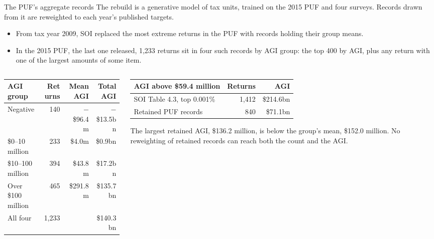 \begin{frame}{The PUF's aggregate records}
  \small
  The rebuild is a generative model of tax units, trained on the 2015 PUF and four surveys. Records
  drawn from it are reweighted to each year's published targets.
  \vspace{0.4em}
  \begin{itemize}
    \item From tax year 2009, SOI replaced the most extreme returns in the PUF with records holding their
          group means.
    \item In the 2015 PUF, the last one released, 1,233 returns sit in four such records by AGI group: the
          top 400 by AGI, plus any return with one of the largest amounts of some item.
  \end{itemize}
  \vspace{0.3em}
  \setlength{\tabcolsep}{3pt}
  \begin{columns}[T]
    \begin{column}{0.47\textwidth}
      \centering\scriptsize
      \begin{tabular}{lrrr}
        \toprule
        AGI group & Returns & Mean AGI & Total AGI \\
        \midrule
        Negative          & 140   & $-$\$96.4m & $-$\$13.5bn \\
        \$0--10 million   & 233   & \$4.0m     & \$0.9bn \\
        \$10--100 million & 394   & \$43.8m    & \$17.2bn \\
        Over \$100 million & 465  & \$291.8m   & \$135.7bn \\
        \midrule
        All four          & 1,233 &            & \$140.3bn \\
        \bottomrule
      \end{tabular}
    \end{column}
    \begin{column}{0.51\textwidth}
      \centering\scriptsize
      \begin{tabular}{lrr}
        \toprule
        AGI above \$59.4 million & Returns & AGI \\
        \midrule
        SOI Table 4.3, top 0.001\% & 1,412 & \$214.6bn \\
        Retained PUF records       & 840   & \$71.1bn \\
        \bottomrule
      \end{tabular}
      \vspace{0.4em}

      \raggedright
      The largest retained AGI, \$136.2 million, is below the group's mean, \$152.0 million. No
      reweighting of retained records can reach both the count and the AGI.
    \end{column}
  \end{columns}
\end{frame}

